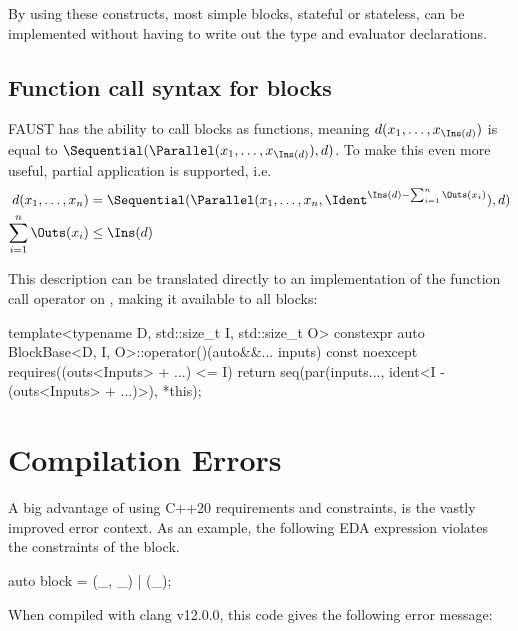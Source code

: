 By using these constructs, most simple blocks, stateful or stateless, can be implemented without having to
write out the type and evaluator declarations.

\subsection{Function call syntax for blocks}
\label{sec:eda_partial_application}

FAUST has the ability to call blocks as functions, meaning $d(x_1, \dots, x_{\Ins(d)})$ is equal to
$\Sequential(\Parallel(x_1, \dots, x_{\Ins(d)}), d)$. To make this even more useful, partial application is supported, i.e.
% 
\begin{align*}
  d(x_1, \dots, x_n)      & ={} \Sequential(\Parallel(x_1, \dots, x_n, \Ident^{\Ins(d) - \sum^n_{i=1} \Outs(x_i)}), d) \\
  \sum^n_{i=1} \Outs(x_i) & \leq \Ins(d)
\end{align*}

This description can be translated directly to an implementation of the function call operator on
, making it available to all blocks:

\begin{cppcodenl}
  template<typename D, std::size_t I, std::size_t O>
  constexpr auto BlockBase<D, I, O>::operator()(auto&&... inputs) const noexcept
  requires((outs<Inputs> + ...) <= I)
  {
    return seq(par(inputs..., ident<I - (outs<Inputs> + ...)>), *this);
  }
\end{cppcodenl}

\section{Compilation Errors}
\label{sec:eda_errors}

A big advantage of using C++20 requirements and constraints, is the vastly improved error context. As an
example, the following EDA expression violates the constraints of the \Sequential block.

\begin{cppcodenl}
auto block = (_, _) | (_);
\end{cppcodenl}

When compiled with clang v12.0.0, this code gives the following error message:

